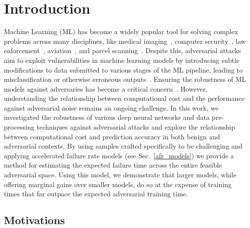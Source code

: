 \section{Introduction}

Machine Learning (ML) has become a widely popular tool for solving complex problems across many disciplines, like medical imaging~\citep{ai_medical_imaging}, computer security~\citep{ai_security}, law enforcement~\citep{ai_prison}, aviation~\citep{ai_aviation}, and parcel scanning~\cite{ai_luggage}. Despite this, adversarial attacks aim to exploit vulnerabilities in machine learning models by introducing subtle modifications to data submitted to various stages of the ML pipeline, leading to misclassification or otherwise erroneous outputs~\citep{chakraborty_adversarial_2018}. Ensuring the robustness of ML models against adversaries has become a critical concern~\citep{adversarialpatch,carlini_towards_2017,croce_reliable_2020,hopskipjump,art2018,meyers}. However, understanding the relationship between computational cost and the performance against adversarial noise remains an ongoing challenge.  In this work, we investigated the robustness of various deep neural networks and data pre-processing techniques against adversarial attacks and explore the relationship between computational cost and  prediction accuracy in both benign and adversarial contexts.  By using samples crafted specifically to be challenging and applying accelerated failure rate models (see Sec.~\ref{afr_models}) we provide a method for estimating the expected failure time across the entire feasible adversarial space. Using this model, we demonstrate that larger models, while offering marginal gains over smaller models, do so at the expense of training times that far outpace the expected adversarial training time.

\subsection{Motivations}

